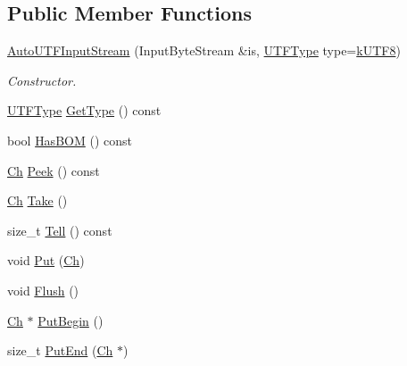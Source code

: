 \subsection*{Public Member Functions}
\begin{DoxyCompactItemize}
\item 
\hyperlink{classAutoUTFInputStream_a83837fced0971ba26dd9a8ec1575abb0}{Auto\+U\+T\+F\+Input\+Stream} (Input\+Byte\+Stream \&is, \hyperlink{encodings_8h_ac9448aedf514a5bb509bae73a9ce4e58}{U\+T\+F\+Type} type=\hyperlink{encodings_8h_ac9448aedf514a5bb509bae73a9ce4e58a7fd9945f1c494a4a4ee9446017e790f1}{k\+U\+T\+F8})
\begin{DoxyCompactList}\small\item\em Constructor. \end{DoxyCompactList}\item 
\hyperlink{encodings_8h_ac9448aedf514a5bb509bae73a9ce4e58}{U\+T\+F\+Type} \hyperlink{classAutoUTFInputStream_a4b8a3fa5d465a98ec93373cc88102d34}{Get\+Type} () const 
\item 
bool \hyperlink{classAutoUTFInputStream_a74bf5085aaefeb533cbe31719cb0be23}{Has\+B\+OM} () const 
\item 
\hyperlink{classAutoUTFInputStream_a3bb3eb46f2c20404a7ac21963cfe348f}{Ch} \hyperlink{classAutoUTFInputStream_a091e55c06a8013b978c9bab05c9068e3}{Peek} () const 
\item 
\hyperlink{classAutoUTFInputStream_a3bb3eb46f2c20404a7ac21963cfe348f}{Ch} \hyperlink{classAutoUTFInputStream_a652cd1ae8bd848a5ecce4efa1ebd0f38}{Take} ()
\item 
size\+\_\+t \hyperlink{classAutoUTFInputStream_a759b3d2690679ff9eef0c18cb2fbb0cf}{Tell} () const 
\item 
void \hyperlink{classAutoUTFInputStream_a5ea730d1ab715f58ce4f9e3dcd77810a}{Put} (\hyperlink{classAutoUTFInputStream_a3bb3eb46f2c20404a7ac21963cfe348f}{Ch})
\item 
void \hyperlink{classAutoUTFInputStream_aecc08f52794d761fc1b729907a83dcf8}{Flush} ()
\item 
\hyperlink{classAutoUTFInputStream_a3bb3eb46f2c20404a7ac21963cfe348f}{Ch} $\ast$ \hyperlink{classAutoUTFInputStream_a761841842c147c0bb1a69bfacbc117a2}{Put\+Begin} ()
\item 
size\+\_\+t \hyperlink{classAutoUTFInputStream_a41bd66602f82d344383792feac34f9f7}{Put\+End} (\hyperlink{classAutoUTFInputStream_a3bb3eb46f2c20404a7ac21963cfe348f}{Ch} $\ast$)
\end{DoxyCompactItemize}


